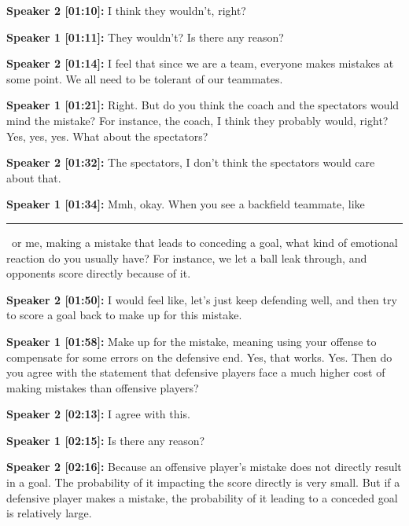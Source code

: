 \documentclass[11pt,a4paper]{article}
\newcommand{\redacted}{\rule{2.5cm}{2ex}}
\begin{document}
\begin{linenumbers}
\vspace{0.5em}
\noindent \textbf{Speaker 2 [01:10]:} I think they wouldn't, right?

\vspace{0.5em}
\noindent \textbf{Speaker 1 [01:11]:} They wouldn't? Is there any reason?

\vspace{0.5em}
\noindent \textbf{Speaker 2 [01:14]:} I feel that since we are a team, everyone makes mistakes at some point. We all need to be tolerant of our teammates.

\vspace{0.5em}
\noindent \textbf{Speaker 1 [01:21]:} Right. But do you think the coach and the spectators would mind the mistake? For instance, the coach, I think they probably would, right? Yes, yes, yes. What about the spectators?

\vspace{0.5em}
\noindent \textbf{Speaker 2 [01:32]:} The spectators, I don't think the spectators would care about that.

\vspace{0.5em}
\noindent \textbf{Speaker 1 [01:34]:} Mmh, okay. When you see a backfield teammate, like \redacted\ or me, making a mistake that leads to conceding a goal, what kind of emotional reaction do you usually have? For instance, we let a ball leak through, and opponents score directly because of it.

\vspace{0.5em}
\noindent \textbf{Speaker 2 [01:50]:} I would feel like, let's just keep defending well, and then try to score a goal back to make up for this mistake.

\vspace{0.5em}
\noindent \textbf{Speaker 1 [01:58]:} Make up for the mistake, meaning using your offense to compensate for some errors on the defensive end. Yes, that works. Yes. Then do you agree with the statement that defensive players face a much higher cost of making mistakes than offensive players?

\vspace{0.5em}
\noindent \textbf{Speaker 2 [02:13]:} I agree with this.

\vspace{0.5em}
\noindent \textbf{Speaker 1 [02:15]:} Is there any reason?

\vspace{0.5em}
\noindent \textbf{Speaker 2 [02:16]:} Because an offensive player's mistake does not directly result in a goal. The probability of it impacting the score directly is very small. But if a defensive player makes a mistake, the probability of it leading to a conceded goal is relatively large.


\end{linenumbers}
\end{document}
